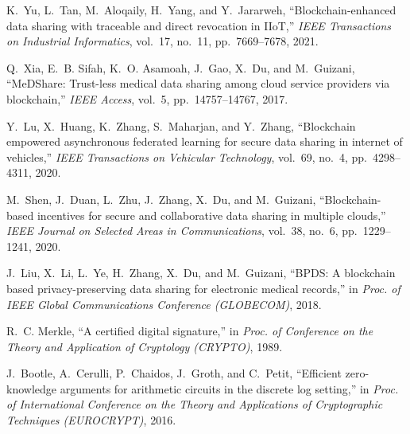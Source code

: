 \documentclass[11pt,divpdfm]{article}
\begin{document}
\begin{thebibliography}{10}
K.~Yu, L.~Tan, M.~Aloqaily, H.~Yang, and Y.~Jararweh, ``Blockchain-enhanced
  data sharing with traceable and direct revocation in {IIoT},'' {\em IEEE
  Transactions on Industrial Informatics}, vol.~17, no.~11, pp.~7669--7678,
  2021.

Q.~Xia, E.~B. Sifah, K.~O. Asamoah, J.~Gao, X.~Du, and M.~Guizani,
  ``{MeDShare}: Trust-less medical data sharing among cloud service providers
  via blockchain,'' {\em IEEE Access}, vol.~5, pp.~14757--14767, 2017.

Y.~Lu, X.~Huang, K.~Zhang, S.~Maharjan, and Y.~Zhang, ``Blockchain empowered
  asynchronous federated learning for secure data sharing in internet of
  vehicles,'' {\em IEEE Transactions on Vehicular Technology}, vol.~69, no.~4,
  pp.~4298--4311, 2020.

M.~Shen, J.~Duan, L.~Zhu, J.~Zhang, X.~Du, and M.~Guizani, ``Blockchain-based
  incentives for secure and collaborative data sharing in multiple clouds,''
  {\em IEEE Journal on Selected Areas in Communications}, vol.~38, no.~6,
  pp.~1229--1241, 2020.

J.~Liu, X.~Li, L.~Ye, H.~Zhang, X.~Du, and M.~Guizani, ``{BPDS}: A blockchain
  based privacy-preserving data sharing for electronic medical records,'' in
  {\em Proc. of IEEE Global Communications Conference (GLOBECOM)}, 2018.

R.~C. Merkle, ``A certified digital signature,'' in {\em Proc. of Conference on
  the Theory and Application of Cryptology (CRYPTO)}, 1989.

J.~Bootle, A.~Cerulli, P.~Chaidos, J.~Groth, and C.~Petit, ``Efficient
  zero-knowledge arguments for arithmetic circuits in the discrete log
  setting,'' in {\em Proc. of International Conference on the Theory and
  Applications of Cryptographic Techniques (EUROCRYPT)}, 2016.

\end{thebibliography}
\end{document}
